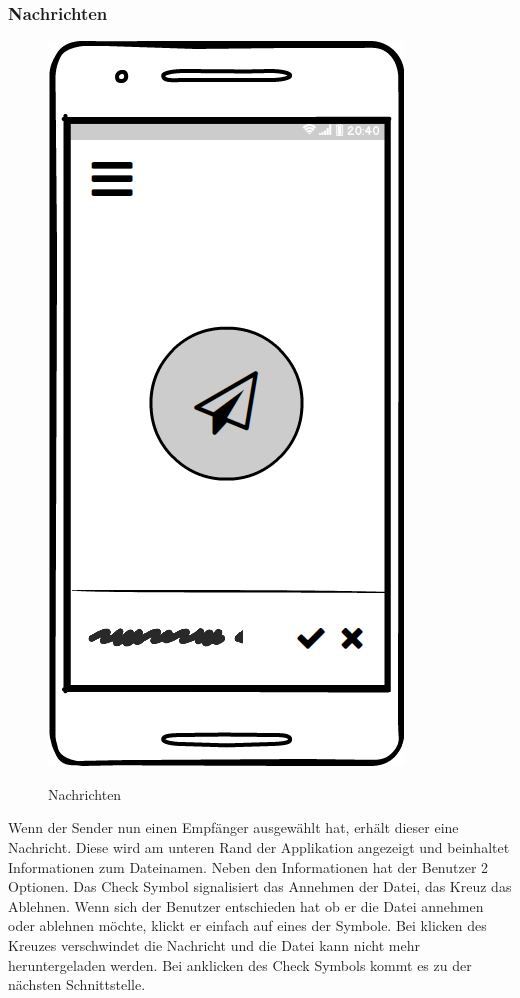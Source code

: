 \subsubsection{Nachrichten}
\begin{figure}[H]
	\centering
	\includegraphics[width=.5\linewidth]{pictures/Mobile/Nachricht.png}\
	\caption{Nachrichten}
\end{figure}
Wenn der Sender nun einen Empfänger ausgewählt hat, erhält dieser eine Nachricht. Diese wird am unteren Rand der Applikation angezeigt und beinhaltet Informationen zum Dateinamen. Neben den Informationen hat der Benutzer 2 Optionen. Das Check Symbol signalisiert das Annehmen der Datei, das Kreuz das Ablehnen. Wenn sich der Benutzer entschieden hat ob er die Datei annehmen oder ablehnen möchte, klickt er einfach auf eines der Symbole. Bei klicken des Kreuzes verschwindet die Nachricht und die Datei kann nicht mehr heruntergeladen werden. Bei anklicken des Check Symbols kommt es zu der nächsten Schnittstelle.
